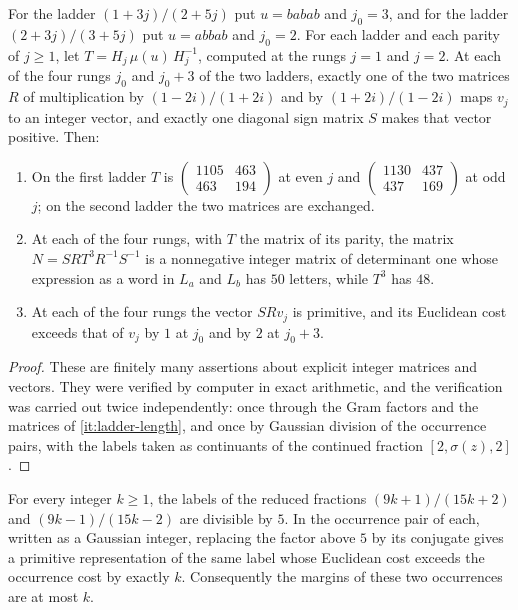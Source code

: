 \begin{lemma}\label{lem:ladder-facts}
For the ladder $(1+3j)/(2+5j)$ put $u=babab$ and $j_0=3$, and for the ladder
$(2+3j)/(3+5j)$ put $u=abbab$ and $j_0=2$. For each ladder and each parity
of $j\geqslant1$, let $T=H_j\,\mu(u)\,H_j^{-1}$, computed at the rungs $j=1$ and
$j=2$. At each of the four rungs $j_0$ and $j_0+3$ of the two ladders, exactly
one of the two matrices $R$ of multiplication by $(1-2i)/(1+2i)$ and by
$(1+2i)/(1-2i)$ maps $v_j$ to an integer vector, and exactly one diagonal sign
matrix $S$ makes that vector positive. Then:
\begin{enumerate}[label=\textup{(\roman*)},ref=\textup{(\roman*)},leftmargin=*]
\item\label{it:ladder-transfer} On the first ladder $T$ is
 $\left(\begin{smallmatrix}1105&463\\463&194\end{smallmatrix}\right)$ at even $j$
 and $\left(\begin{smallmatrix}1130&437\\437&169\end{smallmatrix}\right)$ at odd
 $j$; on the second ladder the two matrices are exchanged.
\item\label{it:ladder-length} At each of the four rungs, with $T$ the matrix of its parity, the
 matrix $N=SRT^3R^{-1}S^{-1}$ is a nonnegative integer matrix of determinant
 one whose expression as a word in $L_a$ and $L_b$ has $50$ letters, while
 $T^3$ has $48$.
\item\label{it:ladder-base} At each of the four rungs the vector $SRv_j$ is primitive, and its
 Euclidean cost exceeds that of $v_j$ by $1$ at $j_0$ and by $2$ at $j_0+3$.
\end{enumerate}
\end{lemma}

\begin{proof}
These are finitely many assertions about explicit integer matrices and
vectors. They were verified by computer in exact arithmetic, and the
verification was carried out twice independently: once through the Gram
factors and the matrices of \ref{it:ladder-length}, and once by Gaussian division of the
occurrence pairs, with the labels taken as continuants of the continued
fraction $[2,\sigma(z),2]$.
\end{proof}

\begin{proposition}\label{prop:two-ladders}
For every integer $k\geqslant1$, the labels of the reduced fractions
$(9k+1)/(15k+2)$ and $(9k-1)/(15k-2)$ are divisible by $5$. In the occurrence
pair of each, written as a Gaussian integer, replacing the factor above $5$
by its conjugate gives a primitive representation of the same label whose
Euclidean cost exceeds the occurrence cost by exactly $k$. Consequently the
margins of these two occurrences are at most $k$.
\end{proposition}

